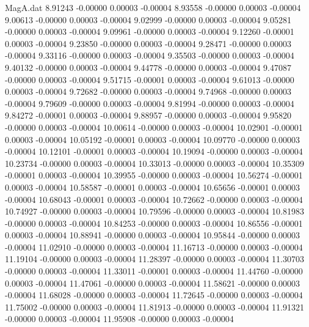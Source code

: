 \begin{filecontents}{MagA.dat}
   8.91243   -0.00000    0.00003   -0.00004
   8.93558   -0.00000    0.00003   -0.00004
   9.00613   -0.00000    0.00003   -0.00004
   9.02999   -0.00000    0.00003   -0.00004
   9.05281   -0.00000    0.00003   -0.00004
   9.09961   -0.00000    0.00003   -0.00004
   9.12260   -0.00001    0.00003   -0.00004
   9.23850   -0.00000    0.00003   -0.00004
   9.28471   -0.00000    0.00003   -0.00004
   9.33116   -0.00000    0.00003   -0.00004
   9.35503   -0.00000    0.00003   -0.00004
   9.40132   -0.00000    0.00003   -0.00004
   9.44778   -0.00000    0.00003   -0.00004
   9.47087   -0.00000    0.00003   -0.00004
   9.51715   -0.00001    0.00003   -0.00004
   9.61013   -0.00000    0.00003   -0.00004
   9.72682   -0.00000    0.00003   -0.00004
   9.74968   -0.00000    0.00003   -0.00004
   9.79609   -0.00000    0.00003   -0.00004
   9.81994   -0.00000    0.00003   -0.00004
   9.84272   -0.00001    0.00003   -0.00004
   9.88957   -0.00000    0.00003   -0.00004
   9.95820   -0.00000    0.00003   -0.00004
  10.00614   -0.00000    0.00003   -0.00004
  10.02901   -0.00001    0.00003   -0.00004
  10.05192   -0.00001    0.00003   -0.00004
  10.09770   -0.00000    0.00003   -0.00004
  10.12101   -0.00001    0.00003   -0.00004
  10.19094   -0.00000    0.00003   -0.00004
  10.23734   -0.00000    0.00003   -0.00004
  10.33013   -0.00000    0.00003   -0.00004
  10.35309   -0.00001    0.00003   -0.00004
  10.39955   -0.00000    0.00003   -0.00004
  10.56274   -0.00001    0.00003   -0.00004
  10.58587   -0.00001    0.00003   -0.00004
  10.65656   -0.00001    0.00003   -0.00004
  10.68043   -0.00001    0.00003   -0.00004
  10.72662   -0.00000    0.00003   -0.00004
  10.74927   -0.00000    0.00003   -0.00004
  10.79596   -0.00000    0.00003   -0.00004
  10.81983   -0.00000    0.00003   -0.00004
  10.84253   -0.00000    0.00003   -0.00004
  10.86556   -0.00001    0.00003   -0.00004
  10.88941   -0.00000    0.00003   -0.00004
  10.95844   -0.00000    0.00003   -0.00004
  11.02910   -0.00000    0.00003   -0.00004
  11.16713   -0.00000    0.00003   -0.00004
  11.19104   -0.00000    0.00003   -0.00004
  11.28397   -0.00000    0.00003   -0.00004
  11.30703   -0.00000    0.00003   -0.00004
  11.33011   -0.00001    0.00003   -0.00004
  11.44760   -0.00000    0.00003   -0.00004
  11.47061   -0.00000    0.00003   -0.00004
  11.58621   -0.00000    0.00003   -0.00004
  11.68028   -0.00000    0.00003   -0.00004
  11.72645   -0.00000    0.00003   -0.00004
  11.75002   -0.00000    0.00003   -0.00004
  11.81913   -0.00000    0.00003   -0.00004
  11.91321   -0.00000    0.00003   -0.00004
  11.95908   -0.00000    0.00003   -0.00004

\end{filecontents}
